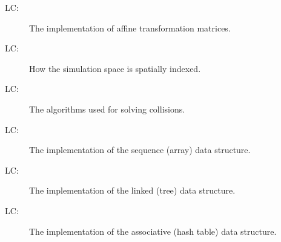 \documentclass[12pt]{article}
\newcounter{lcnum}
\newcommand{\lcthelcnum}{LC\thelcnum}
\begin{document}
\begin{description}
\item[\lcthelcnum\label{LCtransform}:]The implementation of affine transformation matrices.
\end{description}
\begin{description}
\item[\lcthelcnum\label{LCspatialindex}:]How the simulation space is spatially indexed.
\end{description}
\begin{description}
\item[\lcthelcnum\label{LCcollision}:]The algorithms used for solving collisions.
\end{description}
\begin{description}
\item[\lcthelcnum\label{LCarray}:]The implementation of the sequence (array) data structure.
\end{description}
\begin{description}
\item[\lcthelcnum\label{LCtree}:]The implementation of the linked (tree) data structure.
\end{description}
\begin{description}
\item[\lcthelcnum\label{LChashtable}:]The implementation of the associative (hash table) data structure.
\end{description}
\end{document}
